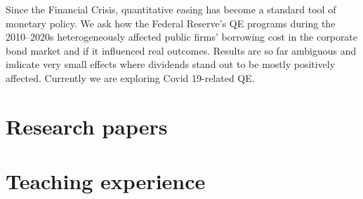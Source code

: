 \documentclass{clean_cv}
\begin{document}
Since the Financial Crisis, quantitative easing has become a standard tool of monetary policy. We ask how the Federal Reserve's QE programs during the 2010--2020s heterogeneously affected public firms' borrowing cost in the corporate bond market and if it influenced real outcomes. Results are so far ambiguous and indicate very small effects where dividends stand out to be mostly positively affected. Currently we are exploring Covid 19-related QE.


\section{Research papers}
\nocite{*}%
\begin{datetabular}{6em}
\end{datetabular}


\section{Teaching experience}
\begin{datetabular}{6em}
\end{datetabular}
\end{document}
